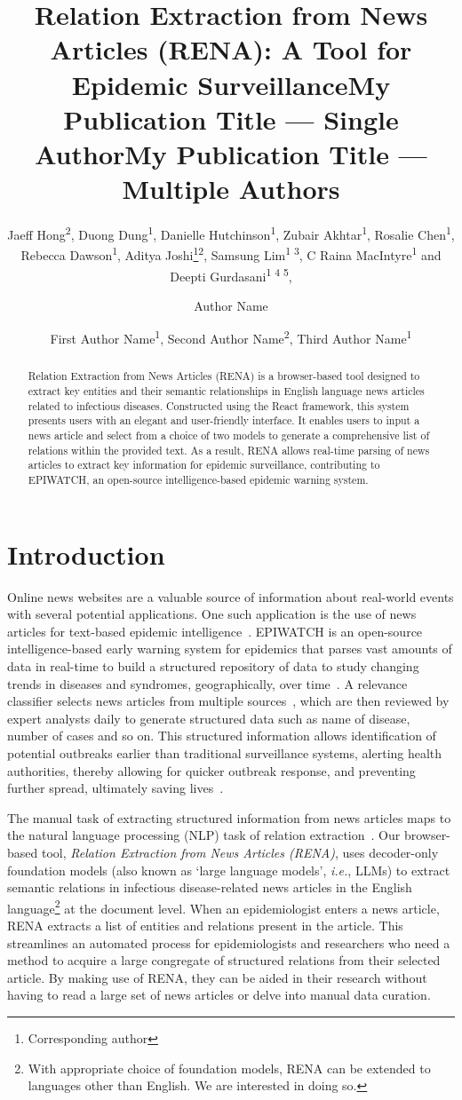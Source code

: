 \documentclass[letterpaper]{article} %
\title{Relation Extraction from News Articles (RENA): A Tool for Epidemic Surveillance}
\author{
    Jaeff Hong\equalcontrib\textsuperscript{\rm 2}, Duong Dung\equalcontrib\textsuperscript{\rm 1}, Danielle Hutchinson\textsuperscript{\rm 1}, Zubair Akhtar\textsuperscript{\rm 1}, Rosalie Chen\textsuperscript{\rm 1}, Rebecca Dawson\textsuperscript{\rm 1}, Aditya Joshi\footnote{Corresponding author}\textsuperscript{\rm 2}, Samsung Lim\textsuperscript{\rm 1 \rm 3}, C Raina MacIntyre\textsuperscript{\rm 1} and Deepti Gurdasani\textsuperscript{\rm 1 \rm 4 \rm 5}, \\
}
\title{My Publication Title --- Single Author}
\author {
    Author Name
}
\title{My Publication Title --- Multiple Authors}
\author {
    First Author Name\textsuperscript{\rm 1},
    Second Author Name\textsuperscript{\rm 2},
    Third Author Name\textsuperscript{\rm 1}
}
\begin{document}
\maketitle

\begin{abstract}
Relation Extraction from News Articles (RENA) is a browser-based tool designed to extract key entities and their semantic relationships in English language news articles related to infectious diseases. Constructed using the React framework, this system presents users with an elegant and user-friendly interface. It enables users to input a news article and select from a choice of two models to generate a comprehensive list of relations within the provided text. As a result, RENA allows real-time parsing of news articles to extract key information for epidemic surveillance, contributing to EPIWATCH, an open-source intelligence-based epidemic warning system.
\end{abstract}

\section{Introduction}
Online news websites are a valuable source of information about real-world events with several potential applications. One such application is the use of news articles for text-based epidemic intelligence~\cite{joshi2019survey}. EPIWATCH is an open-source intelligence-based early warning system for epidemics that parses vast amounts of data in real-time to build a structured repository of data to study changing trends in diseases and syndromes, geographically, over time~\cite{macintyre2023artificial}. A relevance classifier selects news articles from multiple sources~\cite{?}, which are then reviewed by expert analysts daily to generate structured data such as name of disease, number of cases and so on. This structured information allows identification of potential outbreaks earlier than traditional surveillance systems, alerting health authorities, thereby allowing for quicker outbreak response, and preventing further spread, ultimately saving lives~\cite{puca2020using}.

The manual task of extracting structured information from news articles maps to the natural language processing (NLP) task of relation extraction~\cite{banko2008tradeoffs, kumar2017survey}. Our browser-based tool, \textit{Relation Extraction from News Articles (RENA)}, uses decoder-only foundation models (also known as `large language models', \textit{i.e.}, LLMs) to extract semantic relations in infectious disease-related news articles in the English language\footnote{With appropriate choice of foundation models, RENA can be extended to languages other than English. We are interested in doing so.} at the document level. When an epidemiologist enters a news article, RENA extracts a list of entities and relations present in the article. This streamlines an automated process for epidemiologists and researchers who need a method to acquire a large congregate of structured relations from their selected article. By making use of RENA, they can be aided in their research without having to read a large set of news articles or delve into manual data curation.
\end{document}
